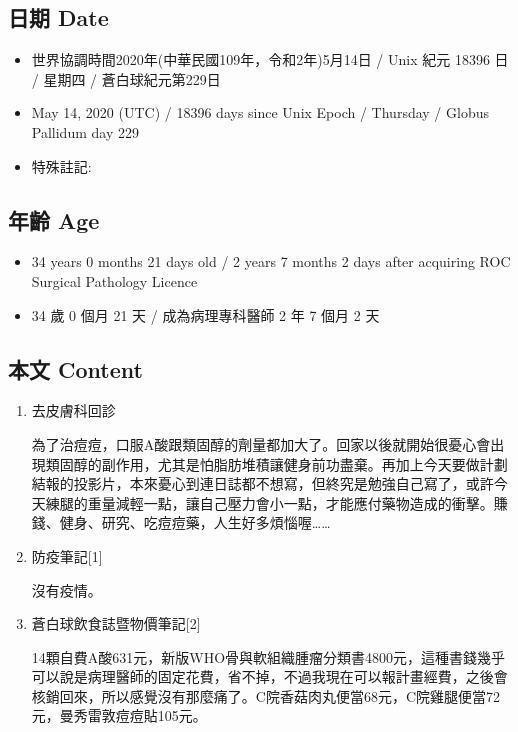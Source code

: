 \documentclass[a5paper, 11pt
]{book}
\providecommand{\tightlist}{%
  \setlength{\itemsep}{0pt}\setlength{\parskip}{0pt}}
\begin{document}
\hypertarget{ux65e5ux671f-date-74}{%
\subsection{日期 Date}\label{ux65e5ux671f-date-74}}

\begin{itemize}
\tightlist
\item
  世界協調時間2020年(中華民國109年，令和2年)5月14日 / Unix 紀元 18396 日
  / 星期四 / 蒼白球紀元第229日
\item
  May 14, 2020 (UTC) / 18396 days since Unix Epoch / Thursday / Globus
  Pallidum day 229
\item
  特殊註記:
\end{itemize}

\hypertarget{ux5e74ux9f61-age-74}{%
\subsection{年齡 Age}\label{ux5e74ux9f61-age-74}}

\begin{itemize}
\tightlist
\item
  34 years 0 months 21 days old / 2 years 7 months 2 days after
  acquiring ROC Surgical Pathology Licence
\item
  34 歲 0 個月 21 天 / 成為病理專科醫師 2 年 7 個月 2 天
\end{itemize}

\hypertarget{ux672cux6587-content-74}{%
\subsection{本文 Content}\label{ux672cux6587-content-74}}

\begin{enumerate}
\def\labelenumi{\arabic{enumi}.}
\item
  去皮膚科回診

  為了治痘痘，口服A酸跟類固醇的劑量都加大了。回家以後就開始很憂心會出現類固醇的副作用，尤其是怕脂肪堆積讓健身前功盡棄。再加上今天要做計劃結報的投影片，本來憂心到連日誌都不想寫，但終究是勉強自己寫了，或許今天練腿的重量減輕一點，讓自己壓力會小一點，才能應付藥物造成的衝擊。賺錢、健身、研究、吃痘痘藥，人生好多煩惱喔\ldots\ldots{}
\item
  防疫筆記{[}1{]}

  沒有疫情。
\item
  蒼白球飲食誌暨物價筆記{[}2{]}

  14顆自費A酸631元，新版WHO骨與軟組織腫瘤分類書4800元，這種書錢幾乎可以說是病理醫師的固定花費，省不掉，不過我現在可以報計畫經費，之後會核銷回來，所以感覺沒有那麼痛了。C院香菇肉丸便當68元，C院雞腿便當72元，曼秀雷敦痘痘貼105元。
\end{enumerate}
\end{document}
